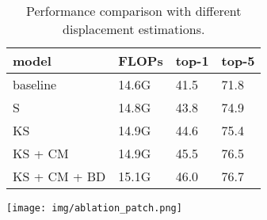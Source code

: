 \documentclass[runningheads]{llncs}
\begin{document}
\begin{table}[t]
    \begin{minipage}{1.0\textwidth}
        \begin{minipage}{0.49\textwidth}
            \fontsize{8.5pt}{9.5pt}\selectfont
            \captionsetup{width=\columnwidth}
            \caption{Performance comparison with different displacement estimations.} 
            \begin{tabular}[t]{L{2.2cm}|C{1.1cm}|C{1.1cm}|C{1.1cm}} 	
                \toprule
                model           & FLOPs     & top-1 & top-5 \\
                \hline
                baseline        & 14.6G     & 41.5 & 71.8  \\
                 \hline
                S               & 14.8G     & 43.8 & 74.9 \\   
                KS              & 14.9G     & 44.6 & 75.4 \\ 
                \hline
                KS + CM         & 14.9G     & 45.5 & 76.5 \\
                KS + CM + BD    & 15.1G     & 46.0 & 76.7 \\
                \bottomrule
            \end{tabular}
            \label{Displacement_table}
        \end{minipage}
        \hfill
        \begin{minipage}{0.47\textwidth}
            \texttt{[image: img/ablation\_patch.png]}
            \captionsetup{width=1.0\columnwidth}
        \label{fig:4}
        \end{minipage}
        

\end{minipage}
\end{table}
\end{document}
